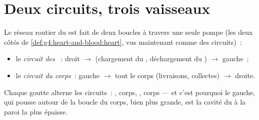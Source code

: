 \section{Deux circuits, trois vaisseaux}

\begin{definition}\label{def:g7:heart-and-circulation:double}
Le réseau routier du  est fait de deux boucles à travers une
seule pompe (les deux côtés de
\cref{def:g4:heart-and-blood:heart}, vus maintenant comme des
circuits)~:
\begin{itemize}
  \item le \emph{circuit des }~:  droit
        $\rightarrow$  (chargement du , déchargement
        du ) $\rightarrow$  gauche~;
  \item le \emph{circuit du corps}~:  gauche
        $\rightarrow$ tout le corps (livraisons, collectes)
        $\rightarrow$  droite.
\end{itemize}
Chaque goutte alterne les circuits~: , corps, , corps
--- et c'est pourquoi le  gauche, qui pousse autour de la
boucle du corps, bien plus grande, est la cavité du  à la paroi
la plus épaisse.
\end{definition}

